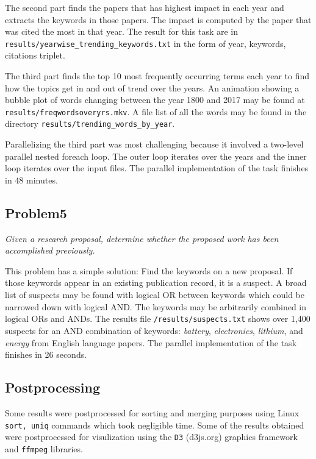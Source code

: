 \documentclass{article}
\begin{document}
The second part finds the papers that has highest impact in each year and
extracts the keywords in those papers. The impact is computed by the paper that
was cited the most in that year. The result for this task are in
\texttt{results/yearwise\_trending\_keywords.txt} in the form of year,
keywords, citations triplet.

The third part finds the top 10 most frequently occurring terms each year to
find how the topics get in and out of trend over the years. An animation
showing a bubble plot of words changing between the year 1800 and 2017 may be
found at \texttt{results/freqwordsoveryrs.mkv}. A file list of all the words
may be found in the directory \texttt{results/trending\_words\_by\_year}.

Parallelizing the third part was most challenging because it involved a
two-level parallel nested foreach loop.  The outer loop iterates over the years
and the inner loop iterates over the input files. The parallel implementation
of the task finishes in 48 minutes.

\subsection*{Problem5}
\textit{Given a research proposal, determine whether the proposed work has been
accomplished previously.}

This problem has a simple solution: Find the keywords on a new proposal. If
those keywords appear in an existing publication record, it is a suspect. A
broad list of suspects may be found with logical OR between keywords which
could be narrowed down with logical AND. The keywords may be arbitrarily combined in
logical ORs and ANDs. The results file \texttt{/results/suspects.txt} shows
over 1,400 suspects for an AND combination of keywords:  \textit{battery},
\textit{electronics}, \textit{lithium}, and \textit{energy} from English
language papers. The parallel implementation of the task finishes in 26
seconds.

\subsection*{Postprocessing}
Some results were postprocessed for sorting and merging purposes using Linux
\texttt{sort, uniq} commands which took negligible time. Some of the results
obtained were postprocessed for visulization using the \texttt{D3} (d3js.org)
graphics framework and \texttt{ffmpeg} libraries.

\end{document}
